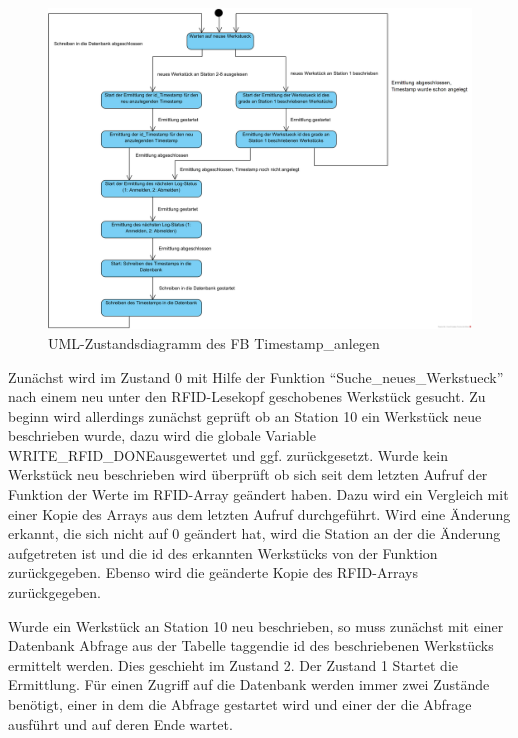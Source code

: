 \begin{figure}[h]
	    \centering
	    \includegraphics[width=1\linewidth]{Bilder/Zustandsdiagramme/Zustandsautomat_Timestamp.png}
        \caption{UML-Zustandsdiagramm des FB Timestamp\_anlegen}
        \label{fig:FB_Timestamp_anlegen}
\end{figure}

Zunächst wird im  Zustand 0 mit Hilfe der Funktion "`Su\-che\_neues\_Werk\-stueck"' nach einem neu unter den RFID-Lesekopf geschobenes Werkstück gesucht. Zu beginn wird allerdings zunächst geprüft ob an Station 10 ein Werkstück neue beschrieben wurde, dazu wird die globale Variable \glqq WRITE\_RFID\_DONE\grqq  ausgewertet und ggf. zurückgesetzt. Wurde kein Werkstück neu beschrieben wird überprüft ob sich seit dem letzten Aufruf der Funktion der Werte im RFID-Array geändert haben. Dazu wird ein Vergleich mit einer Kopie des Arrays aus dem letzten Aufruf durchgeführt. Wird eine Änderung erkannt, die sich  nicht auf 0 geändert hat, wird die Station an der die Änderung aufgetreten ist und die id des erkannten Werkstücks von der Funktion zurückgegeben. Ebenso wird die geänderte  Kopie des RFID-Arrays zurückgegeben.

Wurde ein Werkstück an Station 10 neu beschrieben, so muss zunächst mit einer Datenbank Abfrage aus der Tabelle \glqq taggen\grqq  die id des beschriebenen Werkstücks ermittelt werden. Dies geschieht im Zustand 2. Der Zustand 1 Startet die Ermittlung. Für einen Zugriff auf die Datenbank werden immer zwei Zustände benötigt, einer in dem die Abfrage gestartet wird und einer der die Abfrage ausführt und auf deren Ende wartet. 

